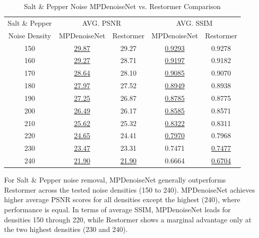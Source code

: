 \begin{table}[H]
    \centering
    \begin{tabular}{ccccc}
        \hline
        Salt \& Pepper & \multicolumn{2}{c}{AVG. PSNR} & \multicolumn{2}{c}{AVG. SSIM} \\
        Noise Density & MPDenoiseNet & Restormer & MPDenoiseNet & Restormer \\
        \hline
        150 & \underline{29.87} & 29.27 & \underline{0.9293} & 0.9278 \\
        160 & \underline{29.27} & 28.71 & \underline{0.9197} & 0.9182 \\
        170 & \underline{28.64} & 28.10 & \underline{0.9085} & 0.9070 \\
        180 & \underline{27.97} & 27.52 & \underline{0.8949} & 0.8938 \\
        190 & \underline{27.25} & 26.87 & \underline{0.8785} & 0.8775 \\
        200 & \underline{26.49} & 26.17 & \underline{0.8585} & 0.8571 \\
        210 & \underline{25.62} & 25.32 & \underline{0.8322} & 0.8311 \\
        220 & \underline{24.65} & 24.41 & \underline{0.7970} & 0.7968 \\
        230 & \underline{23.47} & 23.31 & 0.7471 & \underline{0.7477} \\
        240 & \underline{21.90} & \underline{21.90} & 0.6664 & \underline{0.6704} \\
        \hline
    \end{tabular}
    \caption{Salt \& Pepper Noise MPDenoiseNet vs. Restormer Comparison}
\end{table}

For Salt \& Pepper noise removal, MPDenoiseNet generally outperforms Restormer across the tested noise densities (150 to 240). MPDenoiseNet achieves higher average PSNR scores for all densities except the highest (240), where performance is equal. In terms of average SSIM, MPDenoiseNet leads for densities 150 through 220, while Restormer shows a marginal advantage only at the two highest densities (230 and 240).